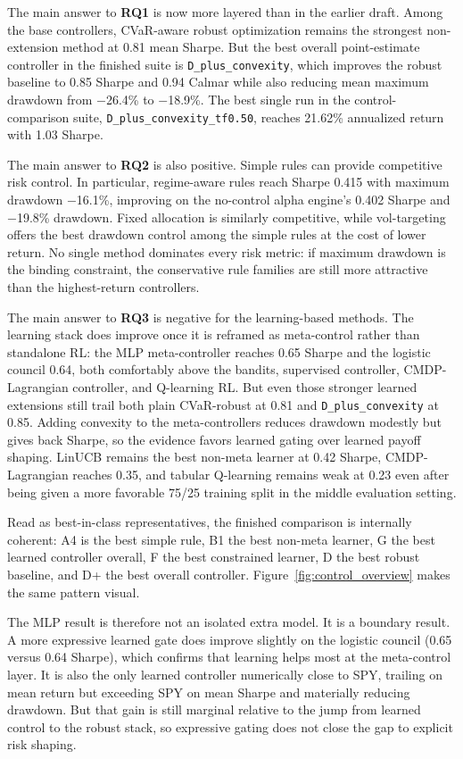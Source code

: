 \documentclass[11pt]{article}
\begin{document}
The main answer to \textbf{RQ1} is now more layered than in the earlier draft.
Among the base controllers, CVaR-aware robust optimization remains the
strongest non-extension method at 0.81 mean Sharpe. But the best overall
point-estimate controller in the finished suite is \texttt{D\_plus\_convexity},
which improves the robust baseline to 0.85 Sharpe and 0.94 Calmar while also
reducing mean maximum drawdown from $-$26.4\% to $-$18.9\%. The best single run
in the control-comparison suite, \texttt{D\_plus\_convexity\_tf0.50}, reaches
21.62\% annualized return with 1.03 Sharpe.

The main answer to \textbf{RQ2} is also positive. Simple rules can provide
competitive risk control. In particular, regime-aware rules reach Sharpe 0.415
with maximum drawdown $-$16.1\%, improving on the no-control alpha engine's
0.402 Sharpe and $-$19.8\% drawdown. Fixed allocation is similarly competitive,
while vol-targeting offers the best drawdown control among the simple rules at
the cost of lower return. No single method dominates every risk metric: if
maximum drawdown is the binding constraint, the conservative rule families are
still more attractive than the highest-return controllers.

The main answer to \textbf{RQ3} is negative for the learning-based methods.
The learning stack does improve once it is reframed as meta-control rather than
standalone RL: the MLP meta-controller reaches 0.65 Sharpe and the logistic
council 0.64, both comfortably above the bandits, supervised controller,
CMDP-Lagrangian controller, and Q-learning RL. But even those stronger learned
extensions still trail both plain CVaR-robust at 0.81 and
\texttt{D\_plus\_convexity} at 0.85. Adding convexity to the meta-controllers
reduces drawdown modestly but gives back Sharpe, so the evidence favors learned
gating over learned payoff shaping. LinUCB remains the best non-meta learner at
0.42 Sharpe, CMDP-Lagrangian reaches 0.35, and tabular Q-learning remains weak
at 0.23 even after being given a more favorable 75/25 training split in the
middle evaluation setting.

Read as best-in-class representatives, the finished comparison is internally coherent: A4 is the best simple rule, B1 the best non-meta learner, G the best learned controller overall, F the best constrained learner, D the best robust baseline, and D+ the best overall controller. Figure~\ref{fig:control_overview} makes the same pattern visual.

The MLP result is therefore not an isolated extra model. It is a boundary
result. A more expressive learned gate does improve slightly on the logistic
council (0.65 versus 0.64 Sharpe), which confirms that learning helps most at
the meta-control layer. It is also the only learned controller numerically
close to SPY, trailing on mean return but exceeding SPY on mean Sharpe and
materially reducing drawdown. But that gain is still marginal relative to the
jump from learned control to the robust stack, so expressive gating does not
close the gap to explicit risk shaping.
\end{document}
